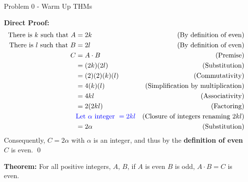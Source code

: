 \begin{problem}{Problem 0 - Warm Up THMs}
\begin{highlight}
        \textbf{Direct Proof:} \newline
        \begin{align*}
            \text{There is $k$ such that } A & = 2k & \text{(By definition of even)} \\
            \text{There is $l$ such that } B & = 2l & \text{(By definition of even)} \\
            C & = A \cdot B & \text{(Premise)} \\
            & = (2k)(2l) & \text{(Substitution)} \\
            & = (2)(2)(k)(l) & \text{(Commutativity)} \\
            & = 4(k)(l) & \text{(Simplification by multiplication)} \\
            & = 4kl & \text{(Associativity)} \\
            & = 2(2kl) & \text{(Factoring)} \\
            & \textcolor{blue}{\text{Let } \alpha \text{ integer } = 2kl} & \text{(Closure of integers renaming $2kl$)} \\
            & = 2\alpha & \text{(Substitution)} \\
        \end{align*}
        Consequently, $C = 2\alpha$ with $\alpha$ is an integer, and thus by the \textbf{definition of even} $C$ is even. \qed
    \end{highlight}

    \begin{highlight}
        \textbf{Theorem:} For all positive integers, $A$, $B$, if $A$ is even $B$ is odd, $A \cdot B = C$ is even. \vspace*{1em}


\end{highlight}
\end{problem}
